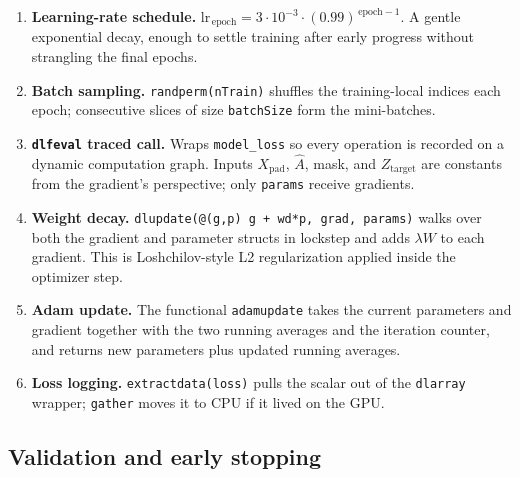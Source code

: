 \documentclass[11pt]{article}
\begin{document}
\begin{enumerate}[leftmargin=1.2em]
  \item \textbf{Learning-rate schedule.}
        $\mathrm{lr}_{\,\text{epoch}}=3\!\cdot\!10^{-3}\cdot(0.99)^{\,\text{epoch}-1}$.
        A gentle exponential decay, enough to settle training after early
        progress without strangling the final epochs.
  \item \textbf{Batch sampling.} \texttt{randperm(nTrain)} shuffles the
        training-local indices each epoch; consecutive slices of size
        \texttt{batchSize} form the mini-batches.
  \item \textbf{\texttt{dlfeval} traced call.} Wraps \texttt{model\_loss} so
        every operation is recorded on a dynamic computation graph.
        Inputs $X_{\text{pad}}$, $\hat A$, mask, and $Z_{\text{target}}$ are
        constants from the gradient's perspective; only \texttt{params}
        receive gradients.
  \item \textbf{Weight decay.} \texttt{dlupdate(@(g,p) g + wd*p, grad, params)}
        walks over both the gradient and parameter structs in lockstep and
        adds $\lambda W$ to each gradient. This is Loshchilov-style L2
        regularization applied inside the optimizer step.
  \item \textbf{Adam update.} The functional \texttt{adamupdate} takes the
        current parameters and gradient together with the two running
        averages and the iteration counter, and returns new parameters plus
        updated running averages.
  \item \textbf{Loss logging.} \texttt{extractdata(loss)} pulls the scalar
        out of the \texttt{dlarray} wrapper; \texttt{gather} moves it to CPU
        if it lived on the GPU.
\end{enumerate}

\subsection{Validation and early stopping}
\end{document}

